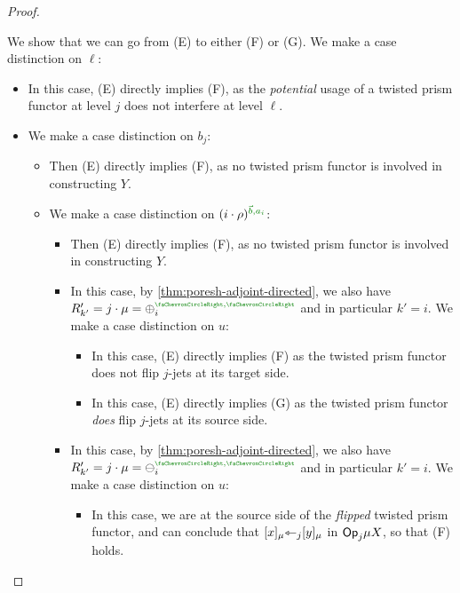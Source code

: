 \documentclass[a4paper]{memoir}
\begin{document}
\begin{proof}
\begin{enumerate}
\begin{itemize}
\begin{itemize}
\begin{description}
					We show that we can go from (E) to either (F) or (G).
					We make a case distinction on $\ell$:
					\begin{itemize}
						\item[\framebox{$\ell \neq j$}] In this case, (E) directly implies (F), as the \emph{potential} usage of a twisted prism functor at level $j$ does not interfere at level $\ell$.
						\item[\framebox{$\ell = j$}] We make a case distinction on $b_j$:
						\begin{itemize}
							\item[\framebox{$b_j = \npolar$}] Then (E) directly implies (F), as no twisted prism functor is involved in constructing $Y$.
							\item[\framebox{$b_j = \ypolar$}] We make a case distinction on $(i \cdot \rho)\pmrhom{\vec b}{a_i}$:
							\begin{itemize}
								\item[\framebox{$i \cdot \rho = \mixpol_j\pmrhom{\ypolar}{a_i}$}] Then (E) directly implies (F), as no twisted prism functor is involved in constructing $Y$.
								\item[\framebox{$i \cdot \rho = \pospol_j\pmryy$}]
								In this case, by \cref{thm:poresh-adjoint-directed}, we also have $R'_{k'} = j \cdot \mu = \pospol_i\pmryy$ and in particular $k' = i$.
								We make a case distinction on $u$:
								\begin{itemize}
									\item[\framebox{$u = w$}]
									In this case, (E) directly implies (F) as the twisted prism functor does not flip $j$-jets at its target side.
									
									\item[\framebox{$u \neq w$}]
									In this case, (E) directly implies (G) as the twisted prism functor \emph{does} flip $j$-jets at its source side.
								\end{itemize}
								
								\item[\framebox{$i \cdot \rho = \negpol_j\pmryy$}]
								In this case, by \cref{thm:poresh-adjoint-directed}, we also have $R'_{k'} = j \cdot \mu = \negpol_i\pmryy$ and in particular $k' = i$.
								We make a case distinction on $u$:
								\begin{itemize}
									\item[\framebox{$u = w$}]
									In this case, we are at the source side of the \emph{flipped} twisted prism functor, and can conclude that $[x]_\mu {\leftarrowtriangle}_j [y]_\mu$ in ${\mathsf{Op}}_j \mu X$, so that (F) holds.
									

\end{itemize}
\end{itemize}
\end{itemize}
\end{itemize}
\end{description}
\end{itemize}
\end{itemize}
\end{enumerate}
\end{proof}
\end{document}
